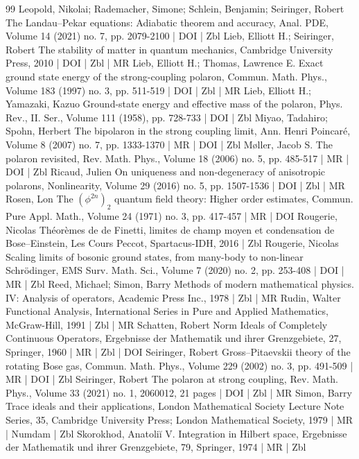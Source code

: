 \begin{thebibliography}{99}
 Leopold, Nikolai; Rademacher, Simone; Schlein, Benjamin; Seiringer, Robert The Landau–Pekar equations: Adiabatic theorem and accuracy, Anal. PDE, Volume 14 (2021) no. 7, pp. 2079-2100 | DOI | Zbl
 Lieb, Elliott H.; Seiringer, Robert The stability of matter in quantum mechanics, Cambridge University Press, 2010 | DOI | Zbl | MR
 Lieb, Elliott H.; Thomas, Lawrence E. Exact ground state energy of the strong-coupling polaron, Commun. Math. Phys., Volume 183 (1997) no. 3, pp. 511-519 | DOI | Zbl | MR
 Lieb, Elliott H.; Yamazaki, Kazuo Ground-state energy and effective mass of the polaron, Phys. Rev., II. Ser., Volume 111 (1958), pp. 728-733 | DOI | Zbl
 Miyao, Tadahiro; Spohn, Herbert The bipolaron in the strong coupling limit, Ann. Henri Poincaré, Volume 8 (2007) no. 7, pp. 1333-1370 | MR | DOI | Zbl
 Møller, Jacob S. The polaron revisited, Rev. Math. Phys., Volume 18 (2006) no. 5, pp. 485-517 | MR | DOI | Zbl
 Ricaud, Julien On uniqueness and non-degeneracy of anisotropic polarons, Nonlinearity, Volume 29 (2016) no. 5, pp. 1507-1536 | DOI | Zbl | MR
 Rosen, Lon The $(\phi^{2n})_2$  quantum field theory: Higher order estimates, Commun. Pure Appl. Math., Volume 24 (1971) no. 3, pp. 417-457 | MR | DOI
 Rougerie, Nicolas Théorèmes de de Finetti, limites de champ moyen et condensation de Bose–Einstein, Les Cours Peccot, Spartacus-IDH, 2016 | Zbl
 Rougerie, Nicolas Scaling limits of bosonic ground states, from many-body to non-linear Schrödinger, EMS Surv. Math. Sci., Volume 7 (2020) no. 2, pp. 253-408 | DOI | MR | Zbl
 Reed, Michael; Simon, Barry Methods of modern mathematical physics. IV: Analysis of operators, Academic Press Inc., 1978 | Zbl | MR
 Rudin, Walter Functional Analysis, International Series in Pure and Applied Mathematics, McGraw-Hill, 1991 | Zbl | MR
 Schatten, Robert Norm Ideals of Completely Continuous Operators, Ergebnisse der Mathematik und ihrer Grenzgebiete, 27, Springer, 1960 | MR | Zbl | DOI
 Seiringer, Robert Gross–Pitaevskii theory of the rotating Bose gas, Commun. Math. Phys., Volume 229 (2002) no. 3, pp. 491-509 | MR | DOI | Zbl
 Seiringer, Robert The polaron at strong coupling, Rev. Math. Phys., Volume 33 (2021) no. 1, 2060012, 21 pages | DOI | Zbl | MR
 Simon, Barry Trace ideals and their applications, London Mathematical Society Lecture Note Series, 35, Cambridge University Press; London Mathematical Society, 1979 | MR | Numdam | Zbl
 Skorokhod, Anatoliĭ V. Integration in Hilbert space, Ergebnisse der Mathematik und ihrer Grenzgebiete, 79, Springer, 1974 | MR | Zbl
\end{thebibliography}
